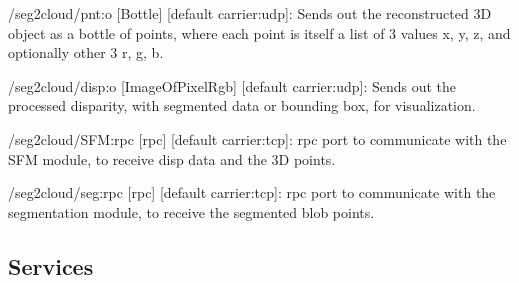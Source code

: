 \begin{DoxyItemize}
\item /seg2cloud/pnt\-:o \mbox{[}Bottle\mbox{]} \mbox{[}default carrier\-:udp\mbox{]}\-: Sends out the reconstructed 3\-D object as a bottle of points, where each point is itself a list of 3 values x, y, z, and optionally other 3 r, g, b.
\item /seg2cloud/disp\-:o \mbox{[}Image\-Of\-Pixel\-Rgb\mbox{]} \mbox{[}default carrier\-:udp\mbox{]}\-: Sends out the processed disparity, with segmented data or bounding box, for visualization.
\item /seg2cloud/\-S\-F\-M\-:rpc \mbox{[}rpc\mbox{]} \mbox{[}default carrier\-:tcp\mbox{]}\-: rpc port to communicate with the S\-F\-M module, to receive disp data and the 3\-D points.
\item /seg2cloud/seg\-:rpc \mbox{[}rpc\mbox{]} \mbox{[}default carrier\-:tcp\mbox{]}\-: rpc port to communicate with the segmentation module, to receive the segmented blob points.
\end{DoxyItemize}\hypertarget{group__seg2cloud_services_sec}{}\subsection{Services}\label{group__seg2cloud_services_sec}
